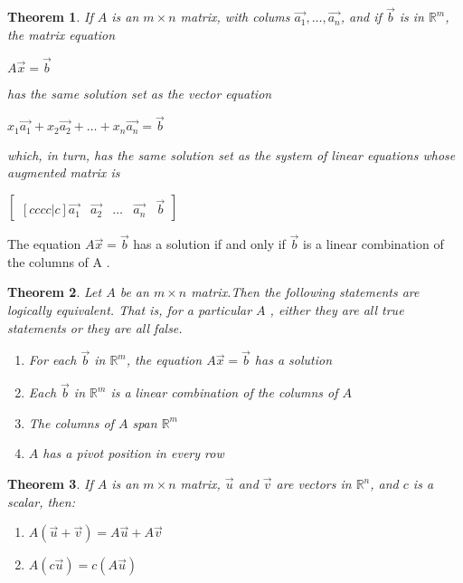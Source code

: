 \documentclass[oneside]{report}
\newtheorem{theorem}{Theorem}[section]
\begin{document}
\begin{theorem}
If $A$ is an $m \times n$ matrix, with colums $\vec{a_1},\dots,\vec{a_n}$, and if $\vec{b}$ is in $\mathbb{R}^m$, the matrix equation
\begin{center}
  $A\vec{x} = \vec{b}$
\end{center}
has the same solution set as the vector equation
\begin{center}
  $x_1\vec{a_1} + x_2\vec{a_2} + \dots + x_n\vec{a_n} = \vec{b}$
\end{center}
which, in turn, has the same solution set as the system of linear equations whose
augmented matrix is
\begin{center}
   $\begin{bmatrix}[cccc|c]
      \vec{a_1} &\vec{a_2} &\dots &\vec{a_n} &\vec{b}
    \end{bmatrix}$
\end{center}
\end{theorem}

The equation $A\vec{x} = \vec{b}$ has a solution if and only if $\vec{b}$ is a linear combination of the columns of A .

\begin{theorem}
Let $A$ be an $m \times n$ matrix.Then the following statements are logically equivalent. That is, for a particular $A$ , either they are all true statements or they are all false.
\begin{enumerate}
  \item For each $\vec{b}$ in $\mathbb{R}^m$, the equation $A\vec{x} = \vec{b}$ has a solution
  \item Each $\vec{b}$ in $\mathbb{R}^m$ is a linear combination of the columns of $A$
  \item The columns of $A$ span $\mathbb{R}^m$
  \item $A$ has a pivot position in every row
\end{enumerate}
\end{theorem}

\begin{theorem}
If $A$ is an $m \times n$ matrix, $\vec{u}$ and $\vec{v}$ are vectors in $\mathbb{R}^n$, and $c$ is a scalar, then:
\begin{enumerate}
  \item $A(\vec{u}+\vec{v}) = A\vec{u} + A\vec{v}$
  \item $A(c\vec{u}) = c(A\vec{u})$
\end{enumerate}
\end{theorem}
\end{document}
